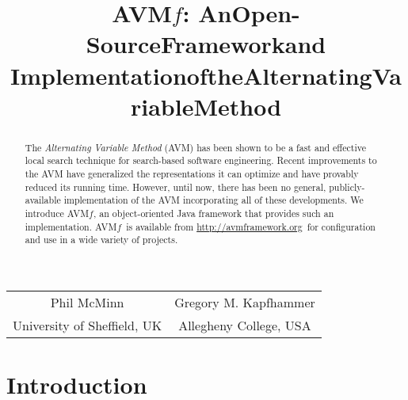 \documentclass{llncs}
\newcommand{\AVM}{Alternating Variable Method\xspace}
\newcommand{\name}{\mbox{AVM\hspace{-1pt}$f$}\xspace}
\newcommand{\repourl}{\url{http://avmframework.org}\xspace}
\begin{document}
\title{\texorpdfstring{\name: An\:Open-Source\:Framework\:and\\$\!$$\!$$\!$Implementation\:of\:the\:Alternating\:Variable\:Method\vspace{-.75em}}{}}
\author{} %
\institute{} %
\maketitle

\vspace{-2em}
\begin{center}
\begin{tabular}{c@{\hskip 3em}c}
    Phil McMinn & Gregory M. Kapfhammer \\
    {\small University of Sheffield, UK} & {\small Allegheny College, USA} \\
\end{tabular}
\end{center}
\vspace{-2em}

\begin{abstract}
The {\it \AVM\/} (AVM) has been shown to be a fast and effective local search technique for %
search-based software engineering.
%
Recent improvements to the AVM have generalized the
representations it can optimize and have provably reduced its running time.
However, until now, there has been no general, publicly-available
implementation of the AVM
incorporating
all of these developments.
We introduce \name, an object-oriented
Java framework
that provides
such an implementation. \name~is available from \repourl~for configuration and use in a wide variety of projects.\vspace{-1ex}
\end{abstract}

\vspace{-2.5em}
\section{Introduction}
\vspace{-1em}
\end{document}
